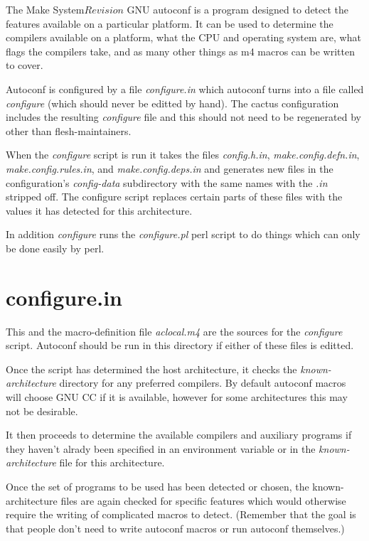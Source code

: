\begin{cactuspart}{3}{The Make System}{}{$Revision$}
GNU autoconf is a program designed to detect the features available
on a particular platform.  It can be used to determine the 
compilers available on a platform, what the CPU and operating 
system are, what flags the compilers take, and as many other things
as m4 macros can be written to cover.

Autoconf is configured by a file {\em configure.in} which autoconf
turns into a file called {\em configure} (which should never be
editted by hand).  The cactus configuration includes the resulting
{\em configure} file and this should not need to be regenerated by
other than flesh-maintainers.

When the {\em configure} script is run it takes the files
{\em config.h.in}, {\em make.config.defn.in}, {\em make.config.rules.in},
and {\em make.config.deps.in} and generates new files in the 
configuration's {\em config-data} subdirectory with the same names with the
{\em .in} stripped off.  The configure script replaces certain parts of these
files with the values it has detected for this architecture.

In addition {\em configure} runs the {\em configure.pl} perl script to
do things which can only be done easily by perl.

\section{configure.in}
\label{sec:autoconf:configure}

This and the macro-definition file {\em aclocal.m4} are the 
sources for the {\em configure} script.  Autoconf should be
run in this directory if either of these files is editted.

Once the script has determined the host architecture, it checks
the {\em known-architecture} directory for any preferred 
compilers.  By default autoconf macros will choose GNU CC if
it is available, however for some architectures this may not be
desirable.

It then proceeds to determine the available compilers and auxiliary
programs if they haven't alrady been specified in an environment variable
or in the {\em known-architecture} file for this architecture.

Once the set of programs to be used has been detected or chosen, the
known-architecture files are again checked for specific features
which would otherwise require the writing of complicated macros to detect.
(Remember that the goal is that people don't need to write autoconf macros
or run autoconf themselves.)


\end{cactuspart}
